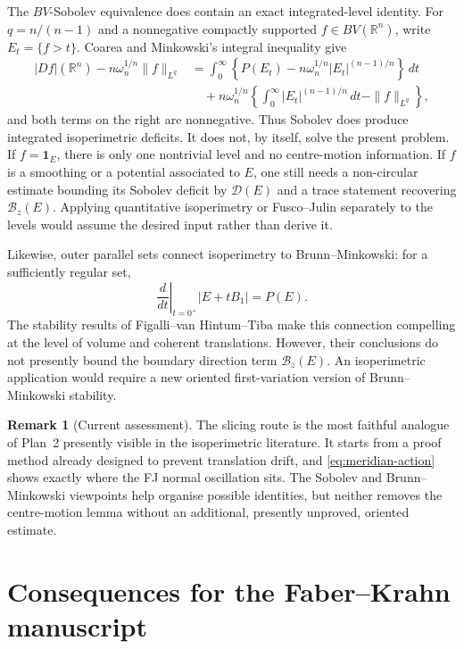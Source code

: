 \documentclass[11pt]{amsart}
\theoremstyle{definition}
\newtheorem{remark}[theorem]{Remark}
\newcommand{\R}{\mathbb R}
\newcommand{\Per}{P}
\newcommand{\Def}{\mathcal D}
\begin{document}
The \(BV\)-Sobolev equivalence does contain an exact integrated-level
identity.  For \(q=n/(n-1)\) and a nonnegative compactly supported
\(f\in BV(\R^n)\), write \(E_t=\{f>t\}\).  Coarea and Minkowski's
integral inequality give
\[
\begin{aligned}
   |Df|(\R^n)-n\omega_n^{1/n}\|f\|_{L^q}
   &=
   \int_0^\infty
     \left\{\Per(E_t)-n\omega_n^{1/n}|E_t|^{(n-1)/n}\right\}\,dt \\
   &\quad+
   n\omega_n^{1/n}
   \left\{\int_0^\infty |E_t|^{(n-1)/n}\,dt-\|f\|_{L^q}\right\},
\end{aligned}
\tag{6.10}\label{eq:BV-Sobolev-splitting}
\]
and both terms on the right are nonnegative.  Thus Sobolev does
produce integrated isoperimetric deficits.  It does not, by itself,
solve the present problem.  If \(f=\mathbf1_E\), there is only one
nontrivial level and no centre-motion information.  If \(f\) is a
smoothing or a potential associated to \(E\), one still needs a
non-circular estimate bounding its Sobolev deficit by \(\Def(E)\) and
a trace statement recovering \(\mathcal B_z(E)\).  Applying
quantitative isoperimetry or Fusco--Julin separately to the levels
would assume the desired input rather than derive it.

Likewise, outer parallel sets connect isoperimetry to Brunn--Minkowski:
for a sufficiently regular set,
\[
   \left.\frac{d}{dt}\right|_{t=0^+}|E+tB_1|=\Per(E).
\tag{6.11}\label{eq:parallel-first-var}
\]
The stability results of Figalli--van Hintum--Tiba
\cite{FvHTBM,FvHTPL} make this connection compelling at the level of
volume and coherent translations.  However, their conclusions do not
presently bound the boundary direction term
\(\mathcal B_z(E)\).  An isoperimetric application would require a new
oriented first-variation version of Brunn--Minkowski stability.

\begin{remark}[Current assessment]\label{rem:intrinsic-assessment}
The slicing route is the most faithful analogue of Plan~2 presently
visible in the isoperimetric literature.  It starts from a proof method
already designed to prevent translation drift, and
\eqref{eq:meridian-action} shows exactly where the FJ normal
oscillation sits.  The Sobolev and Brunn--Minkowski viewpoints help
organise possible identities, but neither removes the centre-motion
lemma without an additional, presently unproved, oriented estimate.
\end{remark}

\section{Consequences for the Faber--Krahn manuscript}\label{sec:application}
\end{document}
